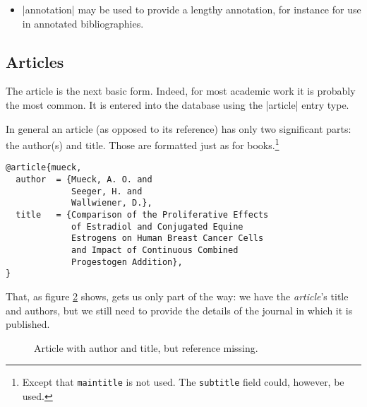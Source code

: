 {\begin{itemize}
\begin{figure}
\caption{Note and addendum\label{addendum}}
\end{figure}
\item |annotation| may be used to provide a lengthy annotation, for
  instance for use in annotated bibliographies.
\end{itemize}

\subsection{Articles}

The article is the next basic form. Indeed, for most academic work it
is probably the most common. It is entered into the database using the
|article| entry type.

In general an article (as opposed to its reference) has only two
significant parts: the author(s) and title. Those are formatted just
as for books.\footnote{Except that \texttt{maintitle} is not used. The
  \texttt{subtitle} field could, however, be used.}
\begin{Verbatim}
@article{mueck,
  author  = {Mueck, A. O. and
             Seeger, H. and
             Wallwiener, D.},
  title   = {Comparison of the Proliferative Effects
             of Estradiol and Conjugated Equine
             Estrogens on Human Breast Cancer Cells
             and Impact of Continuous Combined
             Progestogen Addition},
}
\end{Verbatim}

That, as figure \ref{mueck} shows, gets us only part of the way: we
have the \emph{article}'s title and authors, but we still need to
provide the details of the journal in which it is published.

\begin{figure}
\caption{Article with author and title, but reference missing.\label{mueck}}
\end{figure}

}

